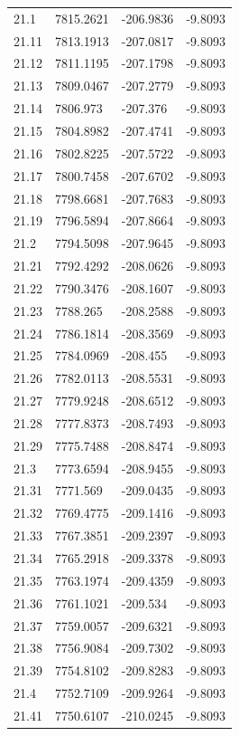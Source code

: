 \begin{table}[H]
\begin{tabular}{llll}
21.1 & 7815.2621 & -206.9836 & -9.8093 \\
21.11 & 7813.1913 & -207.0817 & -9.8093 \\
21.12 & 7811.1195 & -207.1798 & -9.8093 \\
21.13 & 7809.0467 & -207.2779 & -9.8093 \\
21.14 & 7806.973 & -207.376 & -9.8093 \\
21.15 & 7804.8982 & -207.4741 & -9.8093 \\
21.16 & 7802.8225 & -207.5722 & -9.8093 \\
21.17 & 7800.7458 & -207.6702 & -9.8093 \\
21.18 & 7798.6681 & -207.7683 & -9.8093 \\
21.19 & 7796.5894 & -207.8664 & -9.8093 \\
21.2 & 7794.5098 & -207.9645 & -9.8093 \\
21.21 & 7792.4292 & -208.0626 & -9.8093 \\
21.22 & 7790.3476 & -208.1607 & -9.8093 \\
21.23 & 7788.265 & -208.2588 & -9.8093 \\
21.24 & 7786.1814 & -208.3569 & -9.8093 \\
21.25 & 7784.0969 & -208.455 & -9.8093 \\
21.26 & 7782.0113 & -208.5531 & -9.8093 \\
21.27 & 7779.9248 & -208.6512 & -9.8093 \\
21.28 & 7777.8373 & -208.7493 & -9.8093 \\
21.29 & 7775.7488 & -208.8474 & -9.8093 \\
21.3 & 7773.6594 & -208.9455 & -9.8093 \\
21.31 & 7771.569 & -209.0435 & -9.8093 \\
21.32 & 7769.4775 & -209.1416 & -9.8093 \\
21.33 & 7767.3851 & -209.2397 & -9.8093 \\
21.34 & 7765.2918 & -209.3378 & -9.8093 \\
21.35 & 7763.1974 & -209.4359 & -9.8093 \\
21.36 & 7761.1021 & -209.534 & -9.8093 \\
21.37 & 7759.0057 & -209.6321 & -9.8093 \\
21.38 & 7756.9084 & -209.7302 & -9.8093 \\
21.39 & 7754.8102 & -209.8283 & -9.8093 \\
21.4 & 7752.7109 & -209.9264 & -9.8093 \\
21.41 & 7750.6107 & -210.0245 & -9.8093 \\

\end{tabular}
\end{table}
